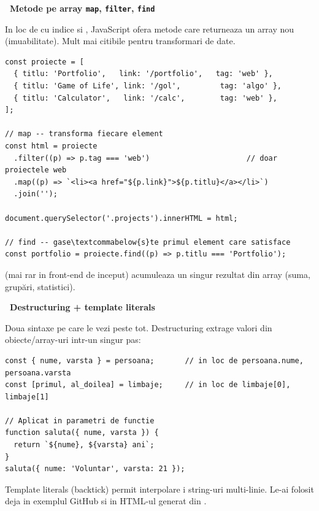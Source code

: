 \begin{bonusbox}
\medskip

\textbf{\faList\ Metode pe array \textendash{} \texttt{map}, \texttt{filter}, \texttt{find}}

In loc de  cu indice si , JavaScript ofera metode care returneaza un array nou (imuabilitate). Mult mai citibile pentru transformari de date.

\begin{lstlisting}[style=js, caption={Lista de proiecte randat\u a din date}]
const proiecte = [
  { titlu: 'Portfolio',   link: '/portfolio',   tag: 'web' },
  { titlu: 'Game of Life', link: '/gol',         tag: 'algo' },
  { titlu: 'Calculator',   link: '/calc',        tag: 'web' },
];

// map -- transforma fiecare element
const html = proiecte
  .filter((p) => p.tag === 'web')                      // doar proiectele web
  .map((p) => `<li><a href="${p.link}">${p.titlu}</a></li>`)
  .join('');

document.querySelector('.projects').innerHTML = html;

// find -- gase\textcommabelow{s}te primul element care satisface
const portfolio = proiecte.find((p) => p.titlu === 'Portfolio');
\end{lstlisting}

 (mai rar in front-end de inceput) acumuleaza un singur rezultat din array (suma, grup\u ari, statistici).

\medskip

\textbf{\faPuzzlePiece\ Destructuring + template literals}

Doua sintaxe pe care le vezi peste tot. Destructuring extrage valori din obiecte/array-uri intr-un singur pas:

\begin{lstlisting}[style=js, numbers=none]
const { nume, varsta } = persoana;       // in loc de persoana.nume, persoana.varsta
const [primul, al_doilea] = limbaje;     // in loc de limbaje[0], limbaje[1]

// Aplicat in parametri de functie
function saluta({ nume, varsta }) {
  return `${nume}, ${varsta} ani`;
}
saluta({ nume: 'Voluntar', varsta: 21 });
\end{lstlisting}

Template literals (backtick) permit interpolare  i string-uri multi-linie. Le-ai folosit deja in exemplul GitHub si in HTML-ul generat din .

\medskip


\end{bonusbox}
